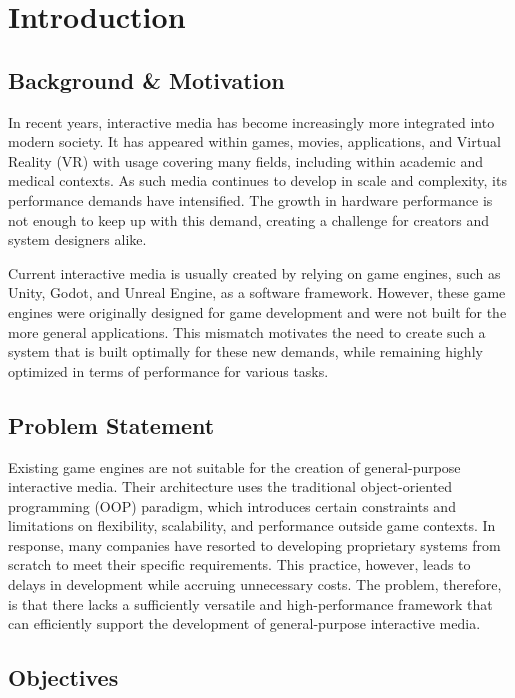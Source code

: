 \section{Introduction}
\label{sec:introduction}

\subsection{Background \& Motivation}
\label{subsec:background-and-motivation}

In recent years, interactive media has become increasingly more integrated into modern society.
It has appeared within games, movies, applications, and Virtual Reality (VR) with usage covering
many fields, including within academic and medical contexts.
As such media continues to develop in scale and complexity, its performance demands have intensified.
The growth in hardware performance is not enough to keep up with this demand, creating a challenge for
creators and system designers alike.

Current interactive media is usually created by relying on game engines, such as Unity, Godot, and Unreal Engine,
as a software framework.
However, these game engines were originally designed for game development and were not built for the more
general applications.
This mismatch motivates the need to create such a system that is built optimally for these new demands,
while remaining highly optimized in terms of performance for various tasks.

\subsection{Problem Statement}
\label{subsec:problem-statement}

Existing game engines are not suitable for the creation of general-purpose interactive media.
Their architecture uses the traditional object-oriented programming (OOP) paradigm, which introduces
certain constraints and limitations on flexibility, scalability, and performance outside game contexts.
In response, many companies have resorted to developing proprietary systems from scratch to meet their specific requirements.
This practice, however, leads to delays in development while accruing unnecessary costs.
The problem, therefore, is that there lacks a sufficiently versatile and high-performance framework that can
efficiently support the development of general-purpose interactive media.

\subsection{Objectives}
\label{subsec:objectives}

